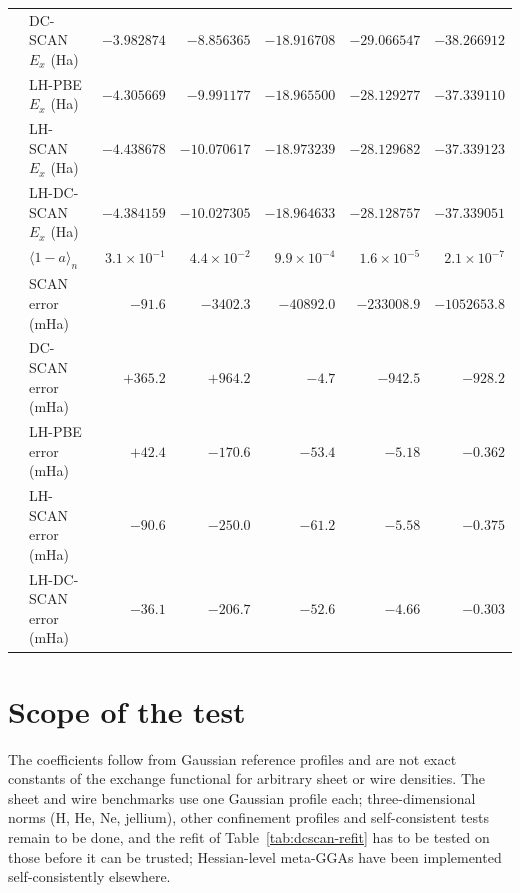 \documentclass[journal=jctcce,manuscript=suppinfo]{achemso}
\begin{document}
\begin{table}[H]
\begin{tabular}{@{}llrrrrr@{}}
  & DC-SCAN $E_x$ (Ha) & $-3.982874$ & $-8.856365$ & $-18.916708$ & $-29.066547$ & $-38.266912$ \\
  & LH-PBE $E_x$ (Ha) & $-4.305669$ & $-9.991177$ & $-18.965500$ & $-28.129277$ & $-37.339110$ \\
  & LH-SCAN $E_x$ (Ha) & $-4.438678$ & $-10.070617$ & $-18.973239$ & $-28.129682$ & $-37.339123$ \\
  & LH-DC-SCAN $E_x$ (Ha) & $-4.384159$ & $-10.027305$ & $-18.964633$ & $-28.128757$ & $-37.339051$ \\
  & $\langle1-a\rangle_n$ & $3.1\times10^{-1}$ & $4.4\times10^{-2}$ & $9.9\times10^{-4}$ & $1.6\times10^{-5}$ & $2.1\times10^{-7}$ \\
  & SCAN error (mHa) & $-91.6$ & $-3402.3$ & $-40892.0$ & $-233008.9$ & $-1052653.8$ \\
  & DC-SCAN error (mHa) & $+365.2$ & $+964.2$ & $-4.7$ & $-942.5$ & $-928.2$ \\
  & LH-PBE error (mHa) & $+42.4$ & $-170.6$ & $-53.4$ & $-5.18$ & $-0.362$ \\
  & LH-SCAN error (mHa) & $-90.6$ & $-250.0$ & $-61.2$ & $-5.58$ & $-0.375$ \\
  & LH-DC-SCAN error (mHa) & $-36.1$ & $-206.7$ & $-52.6$ & $-4.66$ & $-0.303$ \\

\bottomrule
\end{tabular}
\end{table}

\section{Scope of the test}
\label{sec:dcscan-scope}
The coefficients follow from Gaussian reference profiles and are not exact
constants of the exchange functional for arbitrary sheet or wire densities.
The sheet and wire benchmarks use one Gaussian profile each;
three-dimensional norms (H, He, Ne, jellium), other confinement profiles and
self-consistent tests remain to be done, and the refit of
Table~\ref{tab:dcscan-refit} has to be tested on those before it can be
trusted; Hessian-level meta-GGAs have been implemented
self-consistently elsewhere\cite{dabbaghi2026hessian}.
\end{document}
